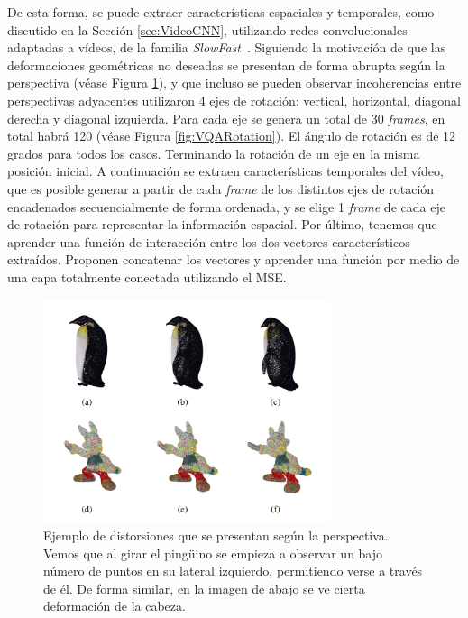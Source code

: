 De esta forma, se puede extraer características espaciales y temporales, como 
discutido en la Sección \ref{sec:VideoCNN}, utilizando redes convolucionales 
adaptadas a vídeos, de la familia \emph{SlowFast}~\cite{SlowFastNetworks}.
Siguiendo la motivación de que las deformaciones geométricas no deseadas se presentan 
de forma abrupta según la perspectiva (véase Figura \ref{fig:ViewPoint}), y que 
incluso se pueden observar incoherencias entre perspectivas adyacentes
utilizaron 4 ejes de rotación: vertical, horizontal, diagonal derecha 
y diagonal izquierda. Para cada eje se genera un total de 30 \emph{frames}, 
en total habrá 120 (véase Figura \ref{fig:VQARotation}). El ángulo de rotación es de 12 grados para todos los casos. 
Terminando la rotación de un eje en la misma posición inicial. 
A continuación se extraen características temporales del vídeo, que es posible 
generar a partir de cada \emph{frame} de los distintos ejes de rotación encadenados
secuencialmente de forma ordenada, y se elige 1 \emph{frame} de cada 
eje de rotación para representar la información espacial. Por último, 
tenemos que aprender una función de interacción entre los dos vectores característicos 
extraídos. Proponen concatenar los vectores y aprender una función por 
medio de una capa totalmente conectada utilizando el MSE.

\begin{figure}
  \begin{center}
    \includegraphics[width=0.75\textwidth]{imagenes/chapter4/ViewPoint}
  \end{center}
  \caption[Ejemplo de distorsiones que se presentan según la perspectiva]{
  Ejemplo de distorsiones que se presentan según la perspectiva.
Vemos que al girar el pingüino se empieza a observar un bajo número de puntos en su 
lateral izquierdo, permitiendo verse a través de él. De forma similar, 
en la imagen de abajo se ve cierta deformación de la cabeza.}
  \label{fig:ViewPoint}
\end{figure}

